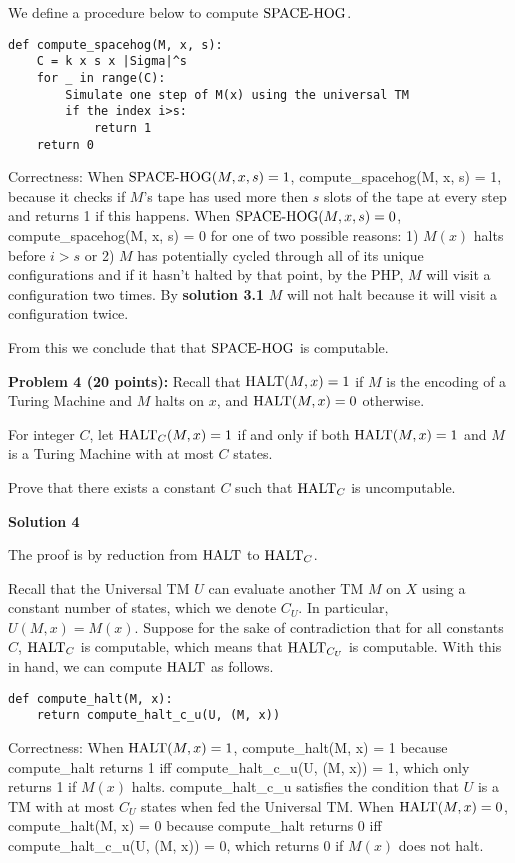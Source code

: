 \documentclass[11pt]{article}
\begin{document}
We define a procedure below to compute $\textrm{SPACE-HOG}$.
\begin{lstlisting}
def compute_spacehog(M, x, s):
    C = k x s x |Sigma|^s
    for _ in range(C):
        Simulate one step of M(x) using the universal TM
        if the index i>s:
            return 1
    return 0
\end{lstlisting}

Correctness: When $\textrm{SPACE-HOG}(M,x,s) = 1$, compute\_spacehog(M, x, s) = 1, because it checks if $M$'s tape has used more then $s$ slots of the tape at every step and returns 1 if this happens. When $\textrm{SPACE-HOG}(M,x,s) = 0$, compute\_spacehog(M, x, s) = 0 for one of two possible reasons: 1) $M(x)$ halts before $i>s$ or 2) $M$ has potentially cycled through all of its unique configurations and if it hasn't halted by that point, by the PHP, $M$ will visit a  configuration two times. By \textbf{solution 3.1} $M$ will not halt because it will visit a configuration twice.

From this we conclude that that $\textrm{SPACE-HOG}$ is computable.

\newpage

\textbf{Problem 4 (20 points):} Recall that $\mathrm{HALT}(M,x) = 1$ if $M$ is the encoding of a Turing Machine and $M$ halts on $x$, and $\mathrm{HALT}(M,x) = 0$ otherwise. 

For integer $C$, let $\mathrm{HALT}_C(M,x) = 1$ if and only if both $\mathrm{HALT}(M,x) = 1$ and $M$ is a Turing Machine with at most $C$ states. 
 
Prove that there exists a constant $C$ such that $\mathrm{HALT}_C$ is uncomputable.

\textbf{Solution 4}

The proof is by reduction from $\mathrm{HALT}$ to $\mathrm{HALT}_C$.

Recall that the Universal TM $U$ can evaluate another TM $M$ on $X$ using a constant number of states, which we denote $C_U$. In particular, $U(M, x) = M(x)$. Suppose for the sake of contradiction that for all constants $C$, $\mathrm{HALT}_C$ is computable, which means that $\mathrm{HALT}_{C_U}$ is computable. With this in hand, we can compute $\mathrm{HALT}$ as follows.

\begin{lstlisting}
def compute_halt(M, x):
    return compute_halt_c_u(U, (M, x))
\end{lstlisting}

Correctness: When $\mathrm{HALT}(M, x) = 1$, compute\_halt(M, x) = 1 because compute\_halt returns 1 iff compute\_halt\_c\_u(U, (M, x)) = 1, which only returns 1 if $M(x)$ halts. compute\_halt\_c\_u satisfies the condition that $U$ is a TM with at most $C_U$ states when fed the Universal TM. When $\mathrm{HALT}(M, x) = 0$, compute\_halt(M, x) = 0 because compute\_halt returns 0 iff compute\_halt\_c\_u(U, (M, x)) = 0, which returns 0 if $M(x)$ does not halt.
\end{document}
